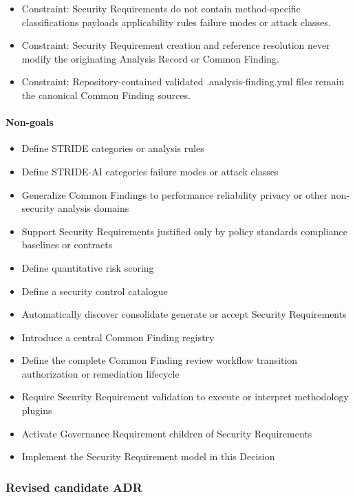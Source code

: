 \documentclass[
  10pt,
]{article}
\providecommand{\tightlist}{%
  \setlength{\itemsep}{0pt}\setlength{\parskip}{0pt}}
\begin{document}
\begin{itemize}
  Constraint: Each Common Finding selected for the Security Requirement
  derivation appears exactly once in the Finding derivation section.
\item
  Constraint: Security Requirements do not contain method-specific
  classifications payloads applicability rules failure modes or attack
  classes.
\item
  Constraint: Security Requirement creation and reference resolution
  never modify the originating Analysis Record or Common Finding.
\item
  Constraint: Repository-contained validated .analysis-finding.yml files
  remain the canonical Common Finding sources.
\end{itemize}

\paragraph{Non-goals}\label{non-goals-6}

\begin{itemize}
\tightlist
\item
  Define STRIDE categories or analysis rules
\item
  Define STRIDE-AI categories failure modes or attack classes
\item
  Generalize Common Findings to performance reliability privacy or other
  non-security analysis domains
\item
  Support Security Requirements justified only by policy standards
  compliance baselines or contracts
\item
  Define quantitative risk scoring
\item
  Define a security control catalogue
\item
  Automatically discover consolidate generate or accept Security
  Requirements
\item
  Introduce a central Common Finding registry
\item
  Define the complete Common Finding review workflow transition
  authorization or remediation lifecycle
\item
  Require Security Requirement validation to execute or interpret
  methodology plugins
\item
  Activate Governance Requirement children of Security Requirements
\item
  Implement the Security Requirement model in this Decision
\end{itemize}

\subsubsection{Revised candidate ADR}\label{revised-candidate-adr-7}
\end{document}
